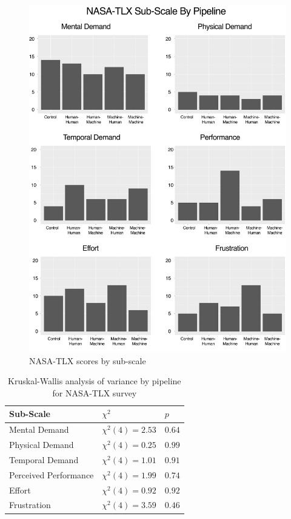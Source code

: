 \begin{figure}[htbp]
  \centering
  \includegraphics[width=\textwidth]{images/plot_tlx.pdf}
  \caption{NASA-TLX scores by sub-scale}
  \label{fig:plot:tlx}
\end{figure}

\begin{table}[htbp]
  \centering
  \caption{Kruskal-Wallis analysis of variance by pipeline for NASA-TLX survey}
  \label{tab:tlx}
  {\tabulinesep=2mm
    \begin{singlespace}
    \begin{tabu} to 0.6\textwidth{|X[c]|X[c]|X[c]|}
        \hline
        Sub-Scale & $\chi^2$ & $p$ \\
        \hline\hline
        Mental Demand & $\chi^2(4) = 2.53$ & $0.64$ \\
        \hline
        Physical Demand & $\chi^2(4) = 0.25$ & $0.99$ \\
        \hline
        Temporal Demand & $\chi^2(4) = 1.01$ & $0.91$ \\
        \hline
        Perceived Performance & $\chi^2(4) = 1.99$ & $0.74$ \\
        \hline
        Effort & $\chi^2(4) = 0.92$ & $0.92$ \\
        \hline
        Frustration & $\chi^2(4) = 3.59$ & $0.46$ \\
    \hline
    \end{tabu}
    \end{singlespace}
    }
\end{table}

